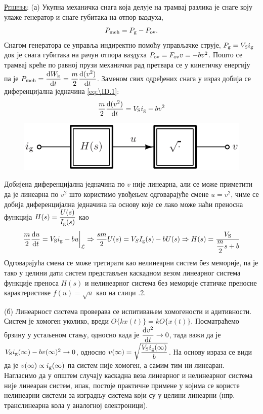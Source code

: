 \textsc{\underline{Решење}}: (а) Укупна механичка снага која делује на трамвај разлика је снаге 
коју улаже генератор и снаге губитака на отпор ваздуха, 
\begin{equation}
P_{\rm meh} = P_{\rm g} - P_{\rm ov}. \label{eq:\ID.1}
\end{equation}
Снагом генератора се управља индиректно помоћу управљачке
струје, $P_{\rm g} = V_{\rm S} i_{\rm g}$ док је снага губитака на рачун отпора ваздуха 
$P_{\rm ov } = F_{\rm ov} v = -bv^2$. Пошто се трамвај креће по равној прузи механички рад 
претвара се у кинетичку енергију па је
$P_{\rm meh} = \dfrac{{\rm d} W_{\rm k}}{{\rm d} t} = \dfrac{m}{2} \dfrac{{\rm d} (v^2)}{{\rm d} t}$. Заменом 
свих одређених снага у израз добија се диференцијална једначина \eqref{eq:\ID.1}:
\begin{equation}
    \dfrac{m}{2} \dfrac{{\rm d} (v^2)}{{\rm d} t} =
    V_{\rm S} i_{\rm g} - bv^2
\end{equation}
%
\begin{figure}[b!]
    \centering
    \includegraphics[scale=1]{fig/tram_diag.pdf}
    \caption{}
\end{figure}
%
Добијена диференцијална једначина по $v$ није линеарна, али се може приметити да је линеарна по $v^2$ што 
користимо увођењем одговарајуће смене $u = v^2$, чиме се добија диференцијална једначина  
на основу које се лако може наћи преносна функција $H(s) = \dfrac{U(s)}{I_{\rm g}(s)}$ \vspace*{1mm} као 
\begin{equation}
    \dfrac{m}{2} \dfrac{{\rm d} u}{{\rm d} t} =
    V_{\rm S} i_{\rm g} - bu \bigg|_{\mathcal L} \Rightarrow
    \dfrac{sm}{2} U(s) = V_S I_{\rm g}(s) - b U(s) \Rightarrow 
    H(s) = \dfrac{V_{\rm S}}{ \dfrac{m}{2} s + b }
\end{equation}
Одговарајућа смена се може третирати као нелинеарни систем без меморије, па је тако у целини 
дати систем представљен каскадном везом линеарног система функције преноса $H(s)$ и нелинеарног система
без меморије статичке преносне карактеристике $f(u) = \sqrt{u}$ као на слици \ID.2.

(б) Линеарност система проверава се испитивањем хомогености и адитивности. Систем је хомоген уколико, вреди 
$O\{kx(t)\} = kO\{x(t)\}$. Посматраћемо брзину у устаљеном стању, односно када је 
$\dfrac{{\rm d} v^2}{{\rm d} t} \to 0$, тада важи да је $V_{\rm S} i_{\rm g}(\infty) - bv(\infty)^2 \to 0$, односно 
$v(\infty) = \sqrt{\dfrac{V_{\rm S} i_{\rm g}(\infty)}{b}}$. На основу израза се види да је 
$v(\infty) \propto i_{\rm g}(\infty)$ па систем није хомоген, а самим тим ни линеаран. 
Нагласимо да у општем случају каскадна веза линеарног 
и нелинеарног система није линеаран систем, ипак, постоје практичне примене у којима се користе нелинеарни системи за изградњу система
који су у целини линеарни (нпр. транслинеарна кола у аналогној електроници).


